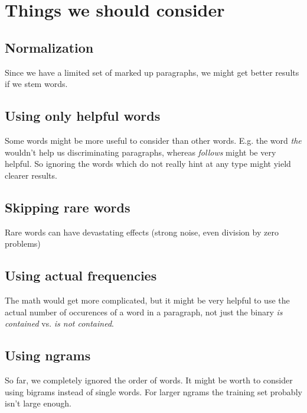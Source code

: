 \documentclass{bluenote}
\begin{document}
\section{Things we should consider}
\subsection{Normalization}
Since we have a limited set of marked up paragraphs, we might get better results if we stem words.
\subsection{Using only helpful words}
Some words might be more useful to consider than other words. E.g. the word \emph{the} wouldn't help us discriminating paragraphs,
whereas \emph{follows} might be very helpful. So ignoring the words which do not really hint at any type might yield clearer results.
\subsection{Skipping rare words}
Rare words can have devastating effects (strong noise, even division by zero problems)
\subsection{Using actual frequencies}
The math would get more complicated, but it might be very helpful to use the actual number of occurences of a word in a paragraph,
not just the binary \emph{is contained} vs. \emph{is not contained}.
\subsection{Using ngrams}
So far, we completely ignored the order of words. It might be worth to consider using bigrams instead of single words.
For larger ngrams the training set probably isn't large enough.
\end{document}
